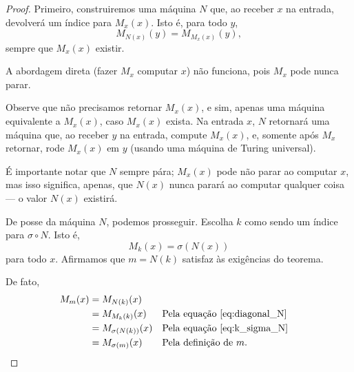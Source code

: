 \begin{proof}
    Primeiro, construiremos uma máquina $N$ que,
    ao receber $x$ na entrada,
    devolverá um índice\footnotemark{} para $M_x(x)$.
    Isto é,
    para todo $y$,
    \begin{equation}
        M_{N(x)}(y) = M_{M_x(x)}(y),
        \label{eq:diagonal_N}
    \end{equation}
    sempre que $M_x(x)$ existir.

    A abordagem direta
    (fazer $M_x$ computar $x$)
    não funciona,
    pois $M_x$ pode nunca parar.

    Observe que não precisamos retornar $M_x(x)$,
    e sim, apenas uma máquina equivalente a $M_x(x)$,
    caso $M_x(x)$ exista.
    Na entrada $x$, $N$ retornará uma máquina que,
    ao receber $y$ na entrada,
    compute $M_x(x)$,
    e, somente após $M_x$ retornar,
    rode $M_x(x)$ em $y$
    (usando uma máquina de Turing universal).

    É importante notar que $N$ sempre pára;
    $M_x(x)$ pode não parar ao computar $x$,
    mas isso significa, apenas,
    que $N(x)$ nunca parará ao computar qualquer coisa
    --- o valor $N(x)$ existirá.

    De posse da máquina $N$, podemos prosseguir.
    Escolha $k$ como sendo um índice para $\sigma \circ N$.
    Isto é,
    \begin{equation}
        M_k(x) = \sigma(N(x))
        \label{eq:k_sigma_N}
    \end{equation}
    para todo $x$.
    Afirmamos que $m = N(k)$
    satisfaz às exigências do teorema.

    De fato,
    \begin{align*}
        M_m(x) &= M_{N(k)}(x) \\
               &= M_{M_k(k)}(x) && \text{Pela equação~\ref{eq:diagonal_N}}\\
               &= M_{\sigma(N(k))}(x) && \text{Pela equação~\ref{eq:k_sigma_N}}\\
               &= M_{\sigma(m)}(x) && \text{Pela definição de $m$.}
    \end{align*}
\end{proof}

